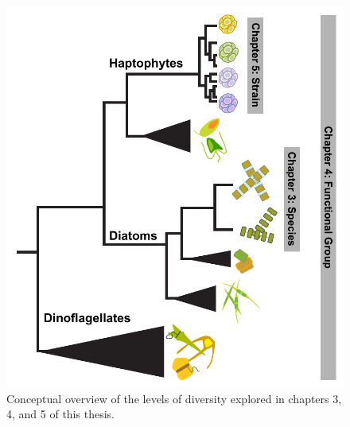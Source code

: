 








\begin{figure}[h!]
  \centering
    \includegraphics[width=.7\textwidth]{Images/C1_ThesisDiagram.pdf}
    \caption{Conceptual overview of the levels of diversity explored in chapters 3, 4, and 5 of this thesis.}
  \label{fig:c1f1}
\end{figure}



